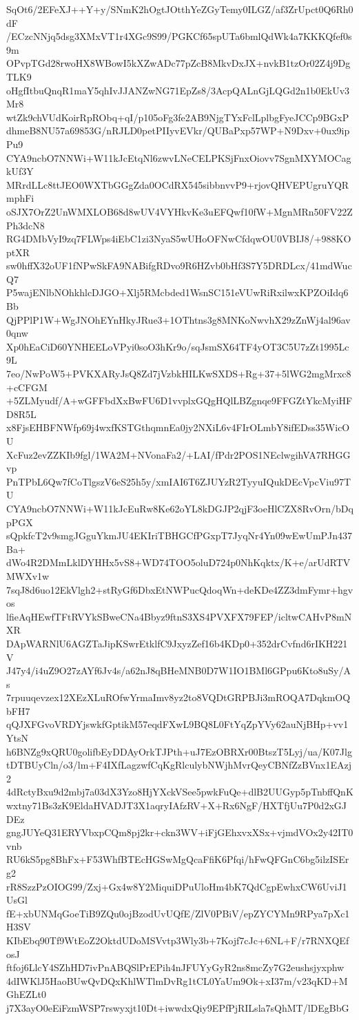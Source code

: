 SqOt6/2EFeXJ++Y+y/SNmK2hOgtJOtthYeZGyTemy0ILGZ/af3ZrUpct0Q6Rh0dF
/ECzcNNjq5dsg3XMxVT1r4XGc9S99/PGKCf65spUTa6bmlQdWk4a7KKKQfef0s9m
OPvpTGd28rwoHX8WBowI5kXZwADc77pZcB8MkvDxJX+nvkB1tzOr02Z4j9DgTLK9
oHgfItbuQnqR1maY5qhIvJJANZwNG71EpZs8/3AcpQALnGjLQGd2n1b0EkUv3Mr8
wtZk9chVUdKoirRpRObq+qI/p105oFg3fe2AB9NjgTYxFclLplbgFyeJCCp9BGxP
dhmeB8NU57a69853G/nRJLD0petPIIyvEVkr/QUBaPxp57WP+N9Dxv+0ux9ipPu9
CYA9ncbO7NNWi+W11kJcEtqNl6zwvLNeCELPKSjFnxOiovv7SgnMXYMOCagkUf3Y
MRrdLLc8ttJEO0WXTbGGgZda0OCdRX545sibbnvvP9+rjovQHVEPUgruYQRmphFi
oSJX7OrZ2UnWMXLOB68d8wUV4VYHkvKe3uEFQwf10fW+MgnMRn50FV22ZPh3dcN8
RG4DMbVyI9zq7FLWps4iEbC1zi3NyaS5wUHoOFNwCfdqwOU0VBIJ8/+988KOptXR
sw0hffX32oUF1fNPwSkFA9NABifgRDvo9R6HZvb0bHf3S7Y5DRDLcx/41mdWucQ7
P5wajENlbNOhkhlcDJGO+Xlj5RMcbded1WsnSC151eVUwRiRxilwxKPZOiIdq6Bb
QjPPlP1W+WgJNOhEYnHkyJRue3+1OThtns3g8MNKoNwvhX29zZnWj4al96av0qnw
Xp0hEaCiD60YNHEELoVPyi0soO3hKr9o/sqJsmSX64TF4yOT3C5U7zZt1995Lc9L
7eo/NwPoW5+PVKXARyJsQ8Zd7jVzbkHILKwSXDS+Rg+37+5lWG2mgMrxc8+cCFGM
+5ZLMyudf/A+wGFFbdXxBwFU6D1vvplxGQgHQlLBZgnqe9FFGZtYkcMyiHFD8R5L
x8FjsEHBFNWfp69j4wxfKSTGthqmnEa0jy2NXiL6v4FIrOLmbY8ifEDss35WicOU
XcFuz2evZZKIb9fgl/1WA2M+NVonaFa2/+LAI/fPdr2POS1NEclwgihVA7RHGGvp
PnTPbL6Qw7fCoTlgszV6eS25h5y/xmIAI6T6ZJUYzR2TyyuIQukDEcVpcViu97TU
CYA9ncbO7NNWi+W11kJcEuRw8Ke62oYL8kDGJP2qjF3oeHlCZX8RvOrn/bDqpPGX
sQpkfcT2v9smgJGguYkmJU4EKIriTBHGCfPGxpT7JyqNr4Yn09wEwUmPJn437Ba+
dWo4R2DMmLklDYHHx5vS8+WD74TOO5oluD724p0NhKqktx/K+e/arUdRTVMWXv1w
7sqJ8d6uo12EkVlgh2+stRyGf6DbxEtNWPucQdoqWn+deKDe4ZZ3dmFymr+hgvos
lfieAqHEwfTFtRVYkSBweCNa4Bbyz9ftnS3XS4PVXFX79FEP/icltwCAHvP8mNXR
DApWARNlU6AGZTaJipKSwrEtklfC9JxyzZef16b4KDp0+352drCvfnd6rIKH221V
J47y4/i4uZ9O27zAYf6Jv4s/a62nJ8qBHeMNB0D7W1IO1BMl6GPpu6Kto8uSy/As
7rpuuqevzex12XEzXLuROfwYrmaImv8yz2to8VQDtGRPBJi3mROQA7DqkmOQbFH7
qQJXFGvoVRDYjswkfGptikM57eqdFXwL9BQ8L0FtYqZpYVy62auNjBHp+vv1YtsN
h6BNZg9xQRU0golifbEyDDAyOrkTJPth+uJ7EzOBRXr00BtszT5Lyj/ua/K07Jlg
tDTBUyCln/o3/lm+F4IXfLagzwfCqKgRlculybNWjhMvrQeyCBNfZzBVnx1EAzj2
4dRctyBxu9d2mbj7a03dX3Yzo8HjYXckVSee5pwkFuQe+dlB2UUGyp5pTnbffQnK
wxtny71Bs3zK9EldaHVADJT3X1aqryIAfzRV+X+Rx6NgF/HXTfjUu7P0d2xGJDEz
gngJUYeQ31ERYVbxpCQm8pj2kr+ckn3WV+iFjGEhxvxXSx+vjmdVOx2y42IT0vnb
RU6kS5pg8BhFx+F53WhfBTEcHGSwMgQcaFfiK6Pfqi/hFwQFGnC6bg5ilzISErg2
rR8SzzPzOIOG99/Zxj+Gx4w8Y2MiquiDPuUloHm4bK7QdCgpEwhxCW6UviJ1UsGl
fE+xbUNMqGoeTiB9ZQu0ojBzodUvUQfE/ZlV0PBiV/epZYCYMn9RPya7pXc1H3SV
KIbEbq90Tf9WtEoZ2OktdUDoMSVvtp3Wly3b+7Kojf7cJc+6NL+F/r7RNXQEfosJ
ftfoj6LlcY4SZhHD7ivPnABQSlPrEPih4nJFUYyGyR2ns8mcZy7G2eushsjyxphw
4dIWKlJ5HaoBUwQvDQxKhlWTlmDvRg1tCL0YaUm9Ok+xI37m/v23qKD+MGhEZLt0
j7X3ayO0eEiFzmWSP7rswyxjt10Dt+iwwdxQiy9EPfPjRILsla7sQhMT/lDEgBbG
